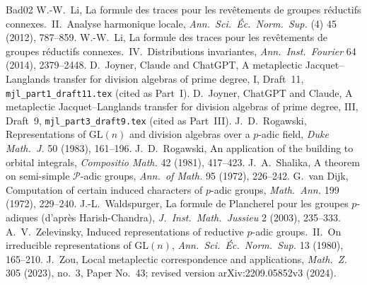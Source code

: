 \documentclass[12pt]{article}
\newcommand{\GL}{\mathrm{GL}}
\theoremstyle{plain}
\theoremstyle{definition}
\begin{document}
\begin{thebibliography}{Bad02}
 W.-W.~Li, La formule des traces pour les rev\^etements de groupes r\'eductifs connexes.\ II.\ Analyse harmonique locale, \emph{Ann.\ Sci.\ \'Ec.\ Norm.\ Sup.} (4) 45 (2012), 787--859.
 W.-W.~Li, La formule des traces pour les rev\^etements de groupes r\'eductifs connexes.\ IV.\ Distributions invariantes, \emph{Ann.\ Inst.\ Fourier} 64 (2014), 2379--2448.
 D.~Joyner, Claude and ChatGPT, A metaplectic Jacquet--Langlands transfer for division algebras of prime degree, I, Draft~11, \texttt{mjl\_part1\_draft11.tex} (cited as Part~I).
 D.~Joyner, ChatGPT and Claude, A metaplectic Jacquet--Langlands transfer for division algebras of prime degree, III, Draft~9, \texttt{mjl\_part3\_draft9.tex} (cited as Part~III).
 J.~D.~Rogawski, Representations of $\GL(n)$ and division algebras over a $p$-adic field, \emph{Duke Math.\ J.} 50 (1983), 161--196.
 J.~D.~Rogawski, An application of the building to orbital integrals, \emph{Compositio Math.} 42 (1981), 417--423.
 J.~A.~Shalika, A theorem on semi-simple $\mathcal P$-adic groups, \emph{Ann.\ of Math.} 95 (1972), 226--242.
 G.~van Dijk, Computation of certain induced characters of $p$-adic groups, \emph{Math.\ Ann.} 199 (1972), 229--240.
 J.-L.~Waldspurger, La formule de Plancherel pour les groupes $p$-adiques (d'apr\`es Harish-Chandra), \emph{J.\ Inst.\ Math.\ Jussieu} 2 (2003), 235--333.
 A.~V.~Zelevinsky, Induced representations of reductive $p$-adic groups.\ II.\ On irreducible representations of $\GL(n)$, \emph{Ann.\ Sci.\ \'Ec.\ Norm.\ Sup.} 13 (1980), 165--210.
 J.~Zou, Local metaplectic correspondence and applications, \emph{Math.\ Z.} 305 (2023), no.~3, Paper No.~43; revised version arXiv:2209.05852v3 (2024).
\end{thebibliography}
\end{document}

